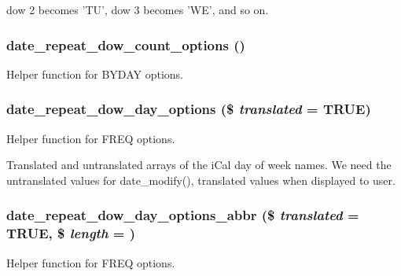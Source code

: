 dow 2 becomes 'TU', dow 3 becomes 'WE', and so on. \hypertarget{date__repeat_8module_a6477b176fba9dd394ca159f555267cb1}{
\subsubsection[{date\_\-repeat\_\-dow\_\-count\_\-options}]{\setlength{\rightskip}{0pt plus 5cm}date\_\-repeat\_\-dow\_\-count\_\-options ()}}
\label{date__repeat_8module_a6477b176fba9dd394ca159f555267cb1}
Helper function for BYDAY options. \hypertarget{date__repeat_8module_a938156c8ac8c3b23be30ae1b539bdf65}{
\subsubsection[{date\_\-repeat\_\-dow\_\-day\_\-options}]{\setlength{\rightskip}{0pt plus 5cm}date\_\-repeat\_\-dow\_\-day\_\-options (\$ {\em translated} = {\ttfamily TRUE})}}
\label{date__repeat_8module_a938156c8ac8c3b23be30ae1b539bdf65}
Helper function for FREQ options.

Translated and untranslated arrays of the iCal day of week names. We need the untranslated values for date\_\-modify(), translated values when displayed to user. \hypertarget{date__repeat_8module_a400fbbb589ca7ebe680239e5332ab5f1}{
\subsubsection[{date\_\-repeat\_\-dow\_\-day\_\-options\_\-abbr}]{\setlength{\rightskip}{0pt plus 5cm}date\_\-repeat\_\-dow\_\-day\_\-options\_\-abbr (\$ {\em translated} = {\ttfamily TRUE}, \/  \$ {\em length} = {})}}
\label{date__repeat_8module_a400fbbb589ca7ebe680239e5332ab5f1}
Helper function for FREQ options.

